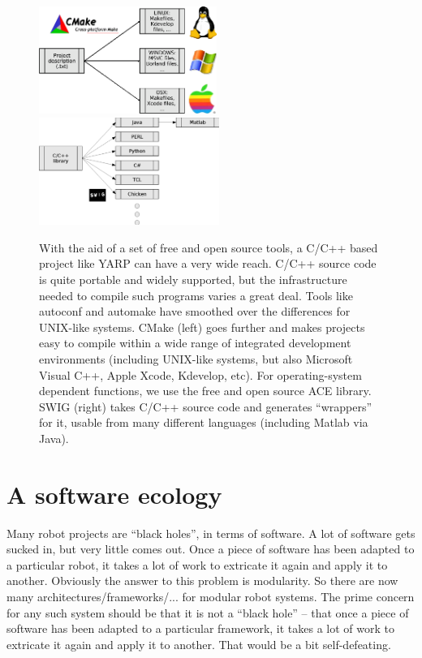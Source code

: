 

\begin{figure}[t]
\begin{center}
\includegraphics[height=3.5cm]{fig-cmake}
\ \ \ \ \ \ 
\includegraphics[height=3.5cm]{fig-swig}
\caption{
%
\label{fig:build}
%
With the aid of a set of free and open source tools, 
a C/C++ based project like YARP can have a very
wide reach.
%
C/C++ source code is quite portable and widely supported, but the
infrastructure needed to compile such programs varies a great 
deal.  Tools like autoconf and automake have smoothed over
the differences for UNIX-like systems. CMake (left) goes
further and makes projects easy to compile within a
wide range of integrated development environments
(including UNIX-like systems, but also Microsoft Visual C++,
Apple Xcode, Kdevelop, etc).
%
For operating-system dependent functions, we use the free
and open source ACE library.
%
SWIG (right) takes C/C++ source code and generates ``wrappers''
for it, usable from many different languages (including Matlab
via Java).
%
%
}
\end{center}
\end{figure}


\section{A software ecology}




Many robot projects are ``black holes'', in terms of software.  A lot
of software gets sucked in, but very little comes out.  Once a piece
of software has been adapted to a particular robot, it takes a lot
of work to extricate it again and apply it to another.
%
Obviously the answer to this problem is modularity.  So there are 
now many architectures/frameworks/... for modular robot systems.
The prime concern for any such system should be that it is not
a ``black hole'' -- that once a piece of software has been adapted
to a particular framework, it takes a lot of work to extricate it
again and apply it to another.  That would be a bit self-defeating.

